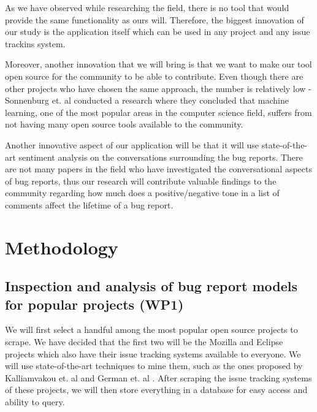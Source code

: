 \documentclass[11pt,english,twocolumn]{article}
\begin{document}
As we have observed while researching the field, there is no tool that would provide the
same functionality as ours will. Therefore, the biggest innovation of our study is the application
itself which can be used in any project and any issue trackins system. 

Moreover, another innovation that we will bring is that we want to make our tool open source
for the community to be able to contribute. Even though there are other projects who have chosen
the same approach, the number is relatively low - Sonnenburg et. al \cite{sonnenburg2007need} 
conducted a research where they concluded that machine learning, one of the most popular 
areas in the computer science field, suffers from not having many open source tools available
to the community.

Another innovative aspect of our application will be that it will use state-of-the-art sentiment
analysis on the conversations surrounding the bug reports. There are not many papers in the field 
who have investigated the conversational aspects of bug reports, thus our research will contribute 
valuable findings to the community regarding how much does a positive/negative tone in a list
of comments affect the lifetime of a bug report.

\section{Methodology}

\subsection*{Inspection and analysis of bug report models for popular projects (WP1)}

We will first select a handful among the most popular open source projects to scrape.
We have decided that the first two will be the Mozilla and Eclipse projects which also have
their issue tracking systems available to everyone. We will use state-of-the-art techniques
to mine them, such as the ones proposed by Kalliamvakou et. al \cite{kalliamvakou2014promises} 
and German et. al \cite{german2016continuously}. After scraping the issue tracking systems
of these projects, we will then store everything in a database for easy access and ability
to query. 
\end{document}
